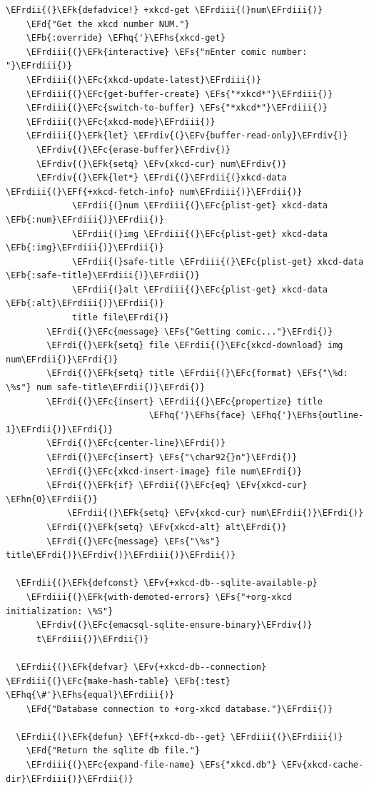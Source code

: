 \documentclass{scrartcl}
\newcommand{\EFk}[1]{\textcolor{EFk}{#1}} %
\newcommand{\EFd}[1]{\textcolor{EFd}{#1}} %
\newcommand{\EFs}[1]{\textcolor{EFs}{#1}} %
\newcommand{\EFb}[1]{\textcolor{EFb}{#1}} %
\newcommand{\EFc}[1]{\textcolor{EFc}{#1}} %
\newcommand{\EFv}[1]{\textcolor{EFv}{#1}} %
\newcommand{\EFf}[1]{\textcolor{EFf}{#1}} %
\newcommand{\EFhn}[1]{#1} %
\newcommand{\EFhq}[1]{#1} %
\newcommand{\EFhs}[1]{#1} %
\newcommand{\EFrdi}[1]{#1} %
\newcommand{\EFrdii}[1]{#1} %
\newcommand{\EFrdiii}[1]{#1} %
\newcommand{\EFrdiv}[1]{#1} %
\begin{document}
\begin{Code}
\begin{Verbatim}[]
  \EFrdii{(}\EFk{defadvice!} +xkcd-get \EFrdiii{(}num\EFrdiii{)}
    \EFd{"Get the xkcd number NUM."}
    \EFb{:override} \EFhq{'}\EFhs{xkcd-get}
    \EFrdiii{(}\EFk{interactive} \EFs{"nEnter comic number: "}\EFrdiii{)}
    \EFrdiii{(}\EFc{xkcd-update-latest}\EFrdiii{)}
    \EFrdiii{(}\EFc{get-buffer-create} \EFs{"*xkcd*"}\EFrdiii{)}
    \EFrdiii{(}\EFc{switch-to-buffer} \EFs{"*xkcd*"}\EFrdiii{)}
    \EFrdiii{(}\EFc{xkcd-mode}\EFrdiii{)}
    \EFrdiii{(}\EFk{let} \EFrdiv{(}\EFv{buffer-read-only}\EFrdiv{)}
      \EFrdiv{(}\EFc{erase-buffer}\EFrdiv{)}
      \EFrdiv{(}\EFk{setq} \EFv{xkcd-cur} num\EFrdiv{)}
      \EFrdiv{(}\EFk{let*} \EFrdi{(}\EFrdii{(}xkcd-data \EFrdiii{(}\EFf{+xkcd-fetch-info} num\EFrdiii{)}\EFrdii{)}
             \EFrdii{(}num \EFrdiii{(}\EFc{plist-get} xkcd-data \EFb{:num}\EFrdiii{)}\EFrdii{)}
             \EFrdii{(}img \EFrdiii{(}\EFc{plist-get} xkcd-data \EFb{:img}\EFrdiii{)}\EFrdii{)}
             \EFrdii{(}safe-title \EFrdiii{(}\EFc{plist-get} xkcd-data \EFb{:safe-title}\EFrdiii{)}\EFrdii{)}
             \EFrdii{(}alt \EFrdiii{(}\EFc{plist-get} xkcd-data \EFb{:alt}\EFrdiii{)}\EFrdii{)}
             title file\EFrdi{)}
        \EFrdi{(}\EFc{message} \EFs{"Getting comic..."}\EFrdi{)}
        \EFrdi{(}\EFk{setq} file \EFrdii{(}\EFc{xkcd-download} img num\EFrdii{)}\EFrdi{)}
        \EFrdi{(}\EFk{setq} title \EFrdii{(}\EFc{format} \EFs{"\%d: \%s"} num safe-title\EFrdii{)}\EFrdi{)}
        \EFrdi{(}\EFc{insert} \EFrdii{(}\EFc{propertize} title
                            \EFhq{'}\EFhs{face} \EFhq{'}\EFhs{outline-1}\EFrdii{)}\EFrdi{)}
        \EFrdi{(}\EFc{center-line}\EFrdi{)}
        \EFrdi{(}\EFc{insert} \EFs{"\char92{}n"}\EFrdi{)}
        \EFrdi{(}\EFc{xkcd-insert-image} file num\EFrdi{)}
        \EFrdi{(}\EFk{if} \EFrdii{(}\EFc{eq} \EFv{xkcd-cur} \EFhn{0}\EFrdii{)}
            \EFrdii{(}\EFk{setq} \EFv{xkcd-cur} num\EFrdii{)}\EFrdi{)}
        \EFrdi{(}\EFk{setq} \EFv{xkcd-alt} alt\EFrdi{)}
        \EFrdi{(}\EFc{message} \EFs{"\%s"} title\EFrdi{)}\EFrdiv{)}\EFrdiii{)}\EFrdii{)}

  \EFrdii{(}\EFk{defconst} \EFv{+xkcd-db--sqlite-available-p}
    \EFrdiii{(}\EFk{with-demoted-errors} \EFs{"+org-xkcd initialization: \%S"}
      \EFrdiv{(}\EFc{emacsql-sqlite-ensure-binary}\EFrdiv{)}
      t\EFrdiii{)}\EFrdii{)}

  \EFrdii{(}\EFk{defvar} \EFv{+xkcd-db--connection} \EFrdiii{(}\EFc{make-hash-table} \EFb{:test} \EFhq{\#'}\EFhs{equal}\EFrdiii{)}
    \EFd{"Database connection to +org-xkcd database."}\EFrdii{)}

  \EFrdii{(}\EFk{defun} \EFf{+xkcd-db--get} \EFrdiii{(}\EFrdiii{)}
    \EFd{"Return the sqlite db file."}
    \EFrdiii{(}\EFc{expand-file-name} \EFs{"xkcd.db"} \EFv{xkcd-cache-dir}\EFrdiii{)}\EFrdii{)}


\end{Verbatim}
\end{Code}
\end{document}
